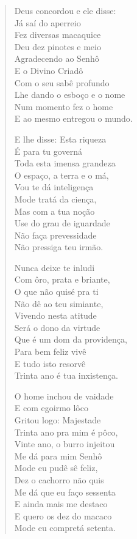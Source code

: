 \begin{verse}
Deus concordou e ele disse:\\
Já saí do aperreio\\
Fez diversas macaquice\\
Deu dez pinotes e meio\\
Agradecendo ao Senhô\\
E o Divino Criadô\\
Com o seu sabê profundo\\
Lhe dando o esboço e o nome\\
Num momento fez o home\\
E ao mesmo entregou o mundo.

E lhe disse: Esta riqueza\\
É para tu governá\\
Toda esta imensa grandeza\\
O espaço, a terra e o má,\\
Vou te dá inteligença\\
Mode tratá da ciença,\\
Mas com a tua noção\\
Use do grau de iguardade\\
Não faça prevessidade\\
Não pressiga teu irmão.

Nunca deixe te inludi\\
Com ôro, prata e briante,\\
O que não quisé pra ti\\
Não dê ao teu simiante,\\
Vivendo nesta atitude\\
Será o dono da virtude\\
Que é um dom da providença,\\
Para bem feliz vivê\\
E tudo isto resorvê\\
Trinta ano é tua inxistença.

O home inchou de vaidade\\
E com egoirmo lôco\\
Gritou logo: Majestade\\
Trinta ano pra mim é pôco,\\
Vinte ano, o burro injeitou\\
Me dá para mim Senhô\\
Mode eu pudê sê feliz,\\
Dez o cachorro não quis\\
Me dá que eu faço sessenta\\
E ainda mais me destaco\\
E quero os dez do macaco\\
Mode eu compretá setenta.


\end{verse}
